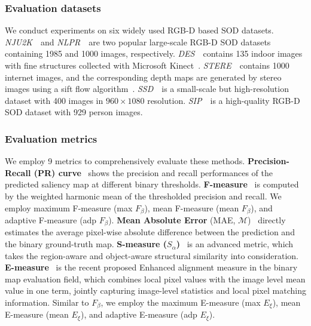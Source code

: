 \documentclass[journal]{IEEEtran}
\newcommand{\NJU}{\textit{NJU2K}~\cite{ju2014depth}}
\newcommand{\NLPR}{\textit{NLPR}~\cite{peng2014rgbd}}
\newcommand{\STERE}{\textit{STERE}~\cite{niu2012leveraging}}
\newcommand{\DES}{\textit{DES}~\cite{cheng2014depth}}
\newcommand{\SSD}{\textit{SSD}~\cite{zhu2017three}}
\newcommand{\SIP}{\textit{SIP}~\cite{fan2019D3Net}}
\begin{document}
\subsubsection{Evaluation datasets} 
We conduct experiments on six widely used RGB-D based SOD datasets. 
\NJU~and \NLPR~are two popular large-scale RGB-D SOD datasets containing 1985 and 1000 images, respectively. 
\DES~contains 135 indoor images with fine structures collected with Microsoft Kinect~\cite{zhang2012microsoft}.
\STERE~contains 1000 internet images, and the corresponding depth maps are generated by stereo images using a sift flow algorithm~\cite{liu2011sift}.
\SSD~is a small-scale but high-resolution dataset with 400 images in $960\times1080$ resolution.
\SIP~is a high-quality RGB-D SOD dataset with 929 person images.

\subsubsection{Evaluation metrics}
We employ 9 metrics to comprehensively evaluate these methods.
\textbf{Precision-Recall (PR) curve}~\cite{powers2011evaluation} shows the precision and recall performances of the predicted saliency map at different binary thresholds.
\textbf{F-measure}~\cite{achanta2009frequency} is computed by the weighted harmonic mean of the thresholded precision and recall. We employ maximum F-measure (max $F_{\beta}$), mean F-measure (mean $F_{\beta}$), and adaptive F-measure (adp $F_{\beta}$).
\textbf{Mean Absolute Error} (MAE, $\mathcal{M}$)~\cite{perazzi2012} directly estimates the average pixel-wise absolute difference between the prediction and the binary ground-truth map.
\textbf{S-measure ($S_{\alpha}$)}~\cite{fan2017structure} is an advanced metric,
which takes the region-aware and object-aware structural similarity into consideration.
\textbf{E-measure}~\cite{Fan2018Enhanced} is the recent proposed Enhanced alignment measure in the binary map evaluation
field, which combines local pixel values with the image level
mean value in one term, jointly capturing image-level
statistics and local pixel matching information.
Similar to $F_{\beta}$, 
we employ the maximum E-measure (max $E_{\xi}$), mean E-measure (mean $E_{\xi}$), and adaptive E-measure (adp $E_{\xi}$).
\end{document}

